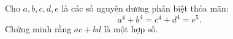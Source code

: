\ifshowproblem
\begin{problem}\label{example:USA-2015-MO-P5}
    Cho \( a, b, c, d, e \) là các số nguyên dương phân biệt thỏa mãn:
    \[
    a^4 + b^4 = c^4 + d^4 = e^5.
    \]
    Chứng minh rằng \( ac + bd \) là một hợp số.
\end{problem}
\fi

\footnotemark
{}
\fi